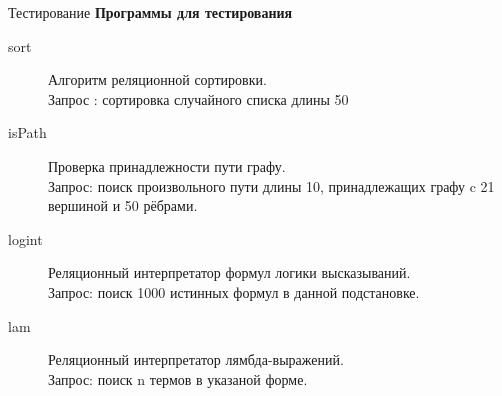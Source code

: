 \documentclass[xcolor=table]{beamer}
\begin{document}
%
\begin{frame}{Тестирование}
{\bf Программы для тестирования}
\begin{description}
\item[sort]Алгоритм реляционной сортировки.\\
      Запрос : сортировка случайного списка длины 50
\item[isPath] Проверка принадлежности пути графу.\\
      Запрос: поиск  произвольного пути длины 10, принадлежащих графу c 21 вершиной и 50 рёбрами.
\item[logint] Реляционный интерпретатор формул логики высказываний.\\
      Запрос: поиск 1000 истинных формул в данной подстановке.
\item[lam] Реляционный интерпретатор лямбда-выражений.\\
      Запрос: поиск n термов в указаной форме.
\end{description}
\end{frame}
%
\end{document}
